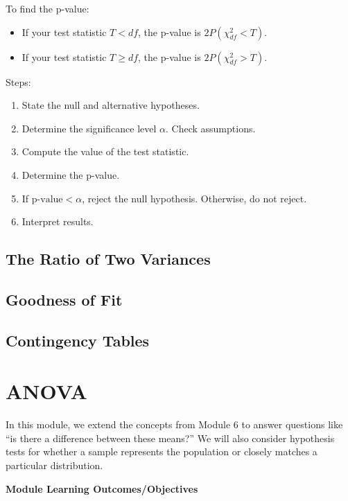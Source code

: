 \documentclass[
]{book}
\providecommand{\tightlist}{%
  \setlength{\itemsep}{0pt}\setlength{\parskip}{0pt}}
\begin{document}
To find the p-value:

\begin{itemize}
\tightlist
\item
  If your test statistic \(T < df\), the p-value is \(2P(\chi^2_{df} < T)\).
\item
  If your test statistic \(T \ge df\), the p-value is \(2P(\chi^2_{df} > T)\).
\end{itemize}

Steps:

\begin{enumerate}
\def\labelenumi{\arabic{enumi}.}
\tightlist
\item
  State the null and alternative hypotheses.
\item
  Determine the significance level \(\alpha\). Check assumptions.
\item
  Compute the value of the test statistic.
\item
  Determine the p-value.
\item
  If \(\text{p-value} < \alpha\), reject the null hypothesis. Otherwise, do not reject.
\item
  Interpret results.
\end{enumerate}

\section{The Ratio of Two Variances}\label{the-ratio-of-two-variances}

\section{Goodness of Fit}\label{goodness-of-fit}

\section{Contingency Tables}\label{contingency-tables-1}

\chapter{ANOVA}\label{anova}

In this module, we extend the concepts from Module 6 to answer questions like ``is there a difference between these means?'' We will also consider hypothesis tests for whether a sample represents the population or closely matches a particular distribution.

\textbf{Module Learning Outcomes/Objectives}
\end{document}

